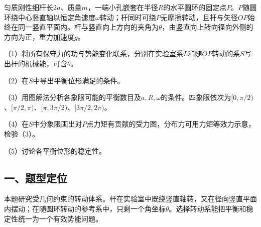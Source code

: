 \documentclass[12pt,a4paper,fontset=fandol]{ctexart}
\begin{document}
匀质刚性细杆长\(2a\)、质量\(m\)，一端小孔嵌套在半径\(R\)的水平圆环的固定点\(P\)。\(P\)随圆环绕中心竖直轴以恒定角速度\(\omega\)转动；杆同时可绕\(P\)无摩擦转动，且杆与矢径\(OP\)始终在同一竖直平面内。杆与竖直向上方向的夹角为\(\theta\)，由竖直向上转向径向外侧的方向为正，重力加速度\(g\)。

\begin{center}
\begin{minipage}{\linewidth}
\centering\begingroup{}
\ifdim\wd\diagrambox>.88\linewidth
\sbox{\diagrambox}{\resizebox{.88\linewidth}{!}{\usebox{\diagrambox}}}\fi
\ifdim\ht\diagrambox>.38\textheight
\resizebox{!}{.38\textheight}{\usebox{\diagrambox}}
\else\usebox{\diagrambox}\fi
\par{}\endgroup\end{minipage}\end{center}

（1）将所有保守力的功与势能变化联系，分别在实验室系\(L\)和随\(OP\)转动的系\(S\)写出杆的机械能，可含\(\theta\)。

（2）在\(S\)中导出平衡位形满足的条件。

（3）用图解法分析各象限可能的平衡数目及\(a,R,\omega\)的条件。四象限依次为\([0,\pi/2)\)、\([\pi/2,\pi)\)、\([\pi,3\pi/2)\)、\([3\pi/2,2\pi)\)。

（4）在\(S\)中分象限画出对\(P\)点力矩有贡献的受力图，分布力可用力矩等效力示意，检验（3）。

（5）讨论各平衡位形的稳定性。

\subsection{一、题型定位}\label{ux4e00ux9898ux578bux5b9aux4f4d-3}

本题研究受几何约束的转动体系。杆在实验室中既绕竖直轴转，又在径向竖直平面内摆动；在随圆环转动的参考系中，只剩一个角坐标\(\theta\)。选择转动系能把平衡和稳定性统一为一个有效势能问题。
\end{document}
